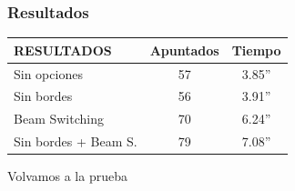 \begin{frame}
    \frametitle{Resultados}
    {\ttfamily
\begin{tabular}{||l||c|c||}
\hline
\hline
RESULTADOS & Apuntados & Tiempo \\
\hline
\hline
Sin opciones & 57 & 3.85'' \\
\hline
Sin bordes & 56 & 3.91'' \\
\hline
Beam Switching & 70 & 6.24'' \\
\hline
Sin bordes + Beam S. & 79& 7.08'' \\
\hline
\hline
\end{tabular}}
    \endblock{}
\end{frame}

\begin{frame}
    \centerline{\LARGE{Volvamos a la prueba}}
\end{frame}
